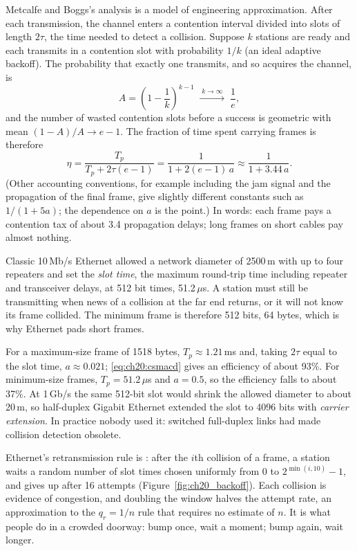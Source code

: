 Metcalfe and Boggs's analysis is a model of engineering approximation. After each transmission, the
channel enters a contention interval divided into slots of length $2\tau$, the time needed to detect a
collision. Suppose $k$ stations are ready and each transmits in a contention slot with probability $1/k$
(an ideal adaptive backoff). The probability that exactly one transmits, and so acquires the channel, is
\begin{equation}
A=\left(1-\frac1k\right)^{k-1}\;\xrightarrow{\;k\to\infty\;}\;\frac1e,
\end{equation}
and the number of wasted contention slots before a success is geometric with mean $(1-A)/A\to e-1$. The
fraction of time spent carrying frames is therefore
\begin{equation}
\eta=\frac{T_p}{T_p+2\tau(e-1)}=\frac{1}{1+2(e-1)\,a}\approx\frac{1}{1+3.44\,a}.
\label{eq:ch20:csmacd}
\end{equation}
(Other accounting conventions, for example including the jam signal and the propagation of the final
frame, give slightly different constants such as $1/(1+5a)$; the dependence on $a$ is the point.) In words:
each frame pays a contention tax of about 3.4 propagation delays; long frames on short cables pay
almost nothing.

\begin{worked}
Classic 10\,Mb/s Ethernet allowed a network diameter of 2500\,m with up to four repeaters and set the
\emph{slot time}, the maximum round-trip time including repeater and transceiver delays, at 512 bit times,
51.2\,$\mu$s. A station must still be transmitting when news of a collision at the far end returns, or it
will not know its frame collided. The minimum frame is therefore 512 bits, 64 bytes, which is why Ethernet
pads short frames.

For a maximum-size frame of 1518 bytes, $T_p\approx1.21$\,ms and, taking $2\tau$ equal to the slot time,
$a\approx0.021$; \eqref{eq:ch20:csmacd} gives an efficiency of about 93\%. For minimum-size frames,
$T_p=51.2\,\mu$s and $a=0.5$, so the efficiency falls to about 37\%. At 1\,Gb/s the same 512-bit slot
would shrink the allowed diameter to about 20\,m, so half-duplex Gigabit Ethernet extended the slot to
4096 bits with \emph{carrier extension}. In practice nobody used it: switched full-duplex links had made
collision detection obsolete.
\end{worked}

Ethernet's retransmission rule is : after the $i$th collision of a
frame, a station waits a random number of slot times chosen uniformly from $0$ to $2^{\min(i,10)}-1$, and
gives up after 16 attempts (Figure~\ref{fig:ch20_backoff}). Each collision is evidence of congestion, and
doubling the window halves the attempt rate, an approximation to the $q_r=1/n$ rule that requires no
estimate of $n$. It is what people do in a crowded doorway: bump once, wait a moment; bump again, wait longer.

